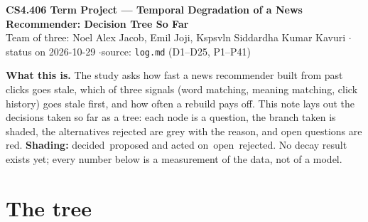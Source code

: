 \documentclass[9pt,a4paper]{article}
\begin{document}
\begin{center}
{\large\textbf{CS4.406 Term Project --- Temporal Degradation of a News Recommender: Decision Tree So Far}}\\[2pt]
{\small Team of three: Noel Alex Jacob, Emil Joji, Kspsvln Siddardha Kumar Kavuri \quad$\cdot$\quad status on 2026-10-29 \quad$\cdot$\quad source: \texttt{log.md} (D1--D25, P1--P41)}
\end{center}
\vspace{2pt}

\textbf{What this is.} The study asks how fast a news recommender built from past clicks goes stale, which of three
signals (word matching, meaning matching, click history) goes stale first, and how often a rebuild pays off. This note
lays out the decisions taken so far as a tree: each node is a question, the branch taken is shaded, the alternatives
rejected are grey with the reason, and open questions are red. \textbf{Shading:}
\colorbox{dec}{decided}\ \colorbox{prp}{proposed and acted on}\ \colorbox{opn}{open}\ \colorbox{rej}{rejected}.
No decay result exists yet; every number below is a measurement of the data, not of a model.

\section{The tree}
\end{document}

